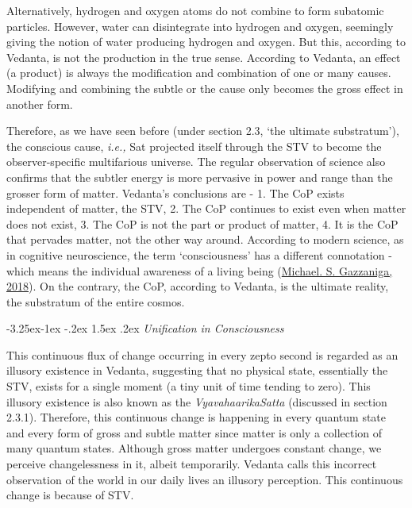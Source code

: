 \documentclass[twoside, 13pt]{article}
\makeatletter
\renewcommand\subsection{\@startsection{subsection}{2}{\z@}%
                                     {-3.25ex\@plus -1ex \@minus -.2ex}%
                                     {1.5ex \@plus .2ex}%
                                     {\normalfont\Large\bfseries}}
\makeatother
\begin{document}
{{Alternatively, hydrogen and oxygen atoms do not combine to form subatomic particles. However, water can disintegrate into hydrogen and oxygen, seemingly giving the notion of water producing hydrogen and oxygen. But this, according to Vedanta, is not the production in the true sense. According to Vedanta, an effect (a product) is always the modification and combination of one or many causes. Modifying and combining the subtle or the cause only becomes the gross effect in another form.


Therefore, as we have seen before (under section 2.3, ‘the ultimate substratum’), the conscious cause, {\it i.e.,} Sat projected itself through the STV to become the observer-specific multifarious universe. The regular observation of science also confirms that the subtler energy is more pervasive in power and range than the grosser form of matter. Vedanta’s conclusions are - 1. The CoP exists independent of matter, the STV, 2. The CoP continues to exist even when matter does not exist, 3. The CoP is not the part or product of matter, 4. It is the CoP that pervades matter, not the other way around. According to modern science, as in cognitive neuroscience, the term ‘consciousness’ has a different connotation - which means the individual awareness of a living being (\underline{Michael. S. Gazzaniga, 2018}). On the contrary, the CoP, according to Vedanta, is the ultimate reality, the substratum of the entire cosmos. }


{\fontsize{8}{10}\selectfont\subsection{\textit{Unification in Consciousness}}}\label{subsec-4.2}

{\fontsize{12}{14}\selectfont This continuous flux of change occurring in every zepto second is regarded as an illusory existence in Vedanta, suggesting that no physical state, essentially the STV, exists for a single moment (a tiny unit of time tending to zero). This illusory existence is also known as the \textit{VyavahaarikaSatta} (discussed in section 2.3.1). Therefore, this continuous change is happening in every quantum state and every form of gross and subtle matter since matter is only a collection of many quantum states. Although gross matter undergoes constant change, we perceive changelessness in it, albeit temporarily. Vedanta calls this incorrect observation of the world in our daily lives an illusory perception. This continuous change is because of STV.

}}
\end{document}
